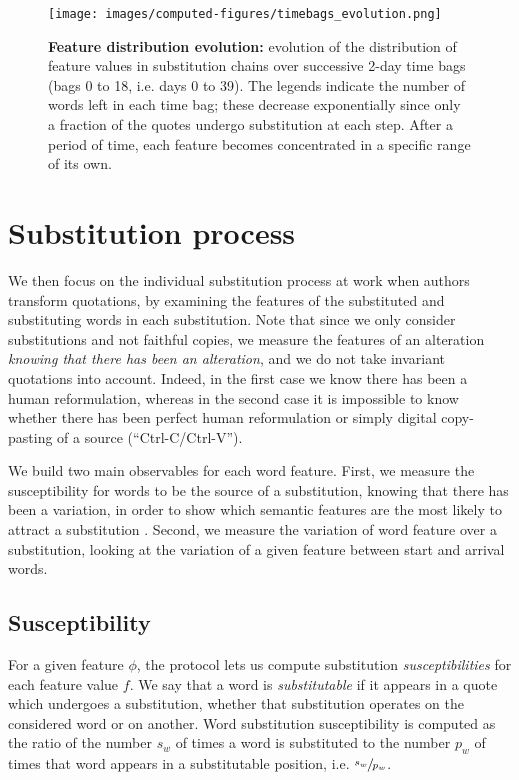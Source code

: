 \begin{figure*}[!th]
    \centering
    \texttt{[image: images/computed-figures/timebags\_evolution.png]}
    \caption{\textbf{Feature distribution evolution:} evolution of the distribution of feature values in substitution chains over successive 2-day time bags (bags 0 to 18, i.e. days 0 to 39).
    The legends indicate the number of words left in each time bag; these decrease exponentially since only a fraction of the quotes undergo substitution at each step.
    After a period of time, each feature becomes concentrated in a specific range of its own.}
    \label{fig:timebags-evolution}
\end{figure*}

\section{Substitution process}

We then focus on the individual substitution process at work when authors transform quotations, by examining the features of the substituted and substituting words in each substitution.
Note that since we only consider substitutions and not faithful copies, we measure the features of an alteration \emph{knowing that there has been an alteration}, and we do not take invariant quotations into account.
Indeed, in the first case we know there has been a human reformulation, whereas in the second case it is impossible to know whether there has been perfect human reformulation or simply digital copy-pasting of a source (``{\sc Ctrl-C}/{\sc Ctrl-V}'').

We build two main observables for each word feature.
First, we measure the susceptibility for words to be the source of a substitution, knowing that there has been a variation, in order to show which semantic features are the most likely to attract a substitution .
Second, we measure the variation of word feature over a substitution, looking at the variation of a given feature between start and arrival words.

\subsection{Susceptibility}

For a given feature $\phi$, the protocol lets us compute substitution \emph{susceptibilities} for each feature value $f$.
We say that a word is \emph{substitutable} if it appears in a quote which undergoes a substitution, whether that substitution operates on the considered word or on another.
Word substitution susceptibility is computed as the ratio of the number $s_w$ of times a word is substituted to the number $p_w$ of times that word appears in a substitutable position, i.e. $\sfrac{s_w}{p_w}$.

